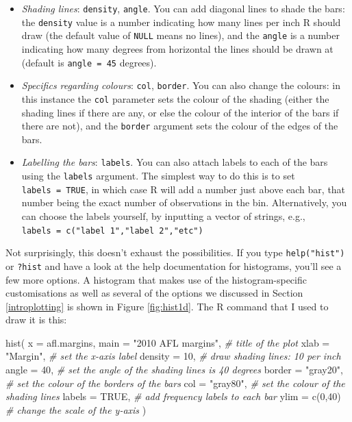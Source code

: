\documentclass[
]{book}
\newenvironment{Shaded}{\begin{snugshade}}{\end{snugshade}}
\newcommand{\AttributeTok}[1]{\textcolor[rgb]{0.77,0.63,0.00}{#1}}
\newcommand{\CommentTok}[1]{\textcolor[rgb]{0.56,0.35,0.01}{\textit{#1}}}
\newcommand{\ConstantTok}[1]{\textcolor[rgb]{0.00,0.00,0.00}{#1}}
\newcommand{\DecValTok}[1]{\textcolor[rgb]{0.00,0.00,0.81}{#1}}
\newcommand{\FunctionTok}[1]{\textcolor[rgb]{0.00,0.00,0.00}{#1}}
\newcommand{\NormalTok}[1]{#1}
\newcommand{\StringTok}[1]{\textcolor[rgb]{0.31,0.60,0.02}{#1}}
\providecommand{\tightlist}{%
  \setlength{\itemsep}{0pt}\setlength{\parskip}{0pt}}
\begin{document}
\begin{itemize}
\tightlist
\item
  \emph{Shading lines}: \texttt{density}, \texttt{angle}. You can add diagonal lines to shade the bars: the \texttt{density} value is a number indicating how many lines per inch R should draw (the default value of \texttt{NULL} means no lines), and the \texttt{angle} is a number indicating how many degrees from horizontal the lines should be drawn at (default is \texttt{angle\ =\ 45} degrees).
\item
  \emph{Specifics regarding colours}: \texttt{col}, \texttt{border}. You can also change the colours: in this instance the \texttt{col} parameter sets the colour of the shading (either the shading lines if there are any, or else the colour of the interior of the bars if there are not), and the \texttt{border} argument sets the colour of the edges of the bars.
\item
  \emph{Labelling the bars}: \texttt{labels}. You can also attach labels to each of the bars using the \texttt{labels} argument. The simplest way to do this is to set \texttt{labels\ =\ TRUE}, in which case R will add a number just above each bar, that number being the exact number of observations in the bin. Alternatively, you can choose the labels yourself, by inputting a vector of strings, e.g., \texttt{labels\ =\ c("label\ 1","label\ 2","etc")}
\end{itemize}

Not surprisingly, this doesn't exhaust the possibilities. If you type \texttt{help("hist")} or \texttt{?hist} and have a look at the help documentation for histograms, you'll see a few more options. A histogram that makes use of the histogram-specific customisations as well as several of the options we discussed in Section \ref{introplotting} is shown in Figure \ref{fig:hist1d}. The R command that I used to draw it is this:

\begin{Shaded}
\begin{Highlighting}[]
\FunctionTok{hist}\NormalTok{( }\AttributeTok{x =}\NormalTok{ afl.margins, }
      \AttributeTok{main =} \StringTok{"2010 AFL margins"}\NormalTok{, }\CommentTok{\# title of the plot}
      \AttributeTok{xlab =} \StringTok{"Margin"}\NormalTok{,           }\CommentTok{\# set the x{-}axis label}
      \AttributeTok{density =} \DecValTok{10}\NormalTok{,              }\CommentTok{\# draw shading lines: 10 per inch}
      \AttributeTok{angle =} \DecValTok{40}\NormalTok{,                }\CommentTok{\# set the angle of the shading lines is 40 degrees}
      \AttributeTok{border =} \StringTok{"gray20"}\NormalTok{,         }\CommentTok{\# set the colour of the borders of the bars}
      \AttributeTok{col =} \StringTok{"gray80"}\NormalTok{,            }\CommentTok{\# set the colour of the shading lines}
      \AttributeTok{labels =} \ConstantTok{TRUE}\NormalTok{,             }\CommentTok{\# add frequency labels to each bar}
      \AttributeTok{ylim =} \FunctionTok{c}\NormalTok{(}\DecValTok{0}\NormalTok{,}\DecValTok{40}\NormalTok{)             }\CommentTok{\# change the scale of the y{-}axis}
\NormalTok{)}
\end{Highlighting}
\end{Shaded}
\end{document}
